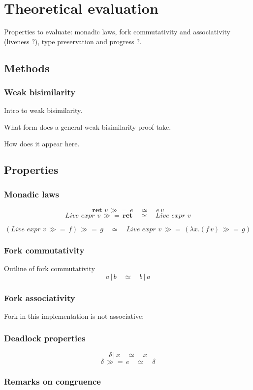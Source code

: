 \documentclass[12pt,twoside,notitlepage]{report}
\begin{document}
\section{Theoretical evaluation}
Properties to evaluate: monadic laws, fork commutativity and associativity (liveness ?), type preservation and progress ?.

\subsection{Methods}

\subsubsection{Weak bisimilarity}
Intro to weak bisimilarity.


What form does a general weak bisimilarity proof take.


How does it appear here.
\subsection{Properties}
\subsubsection{Monadic laws}

\[ \textbf{ret } v\,\gg=\, e\quad \simeq \quad e\,v \]
\[  \textit{Live expr }v\,\gg=\, \textbf{ret}\quad \simeq \quad \textit{Live expr }v \]

\[ (\textit{Live expr }v\, \gg=\, f) \, \gg=\, g \quad \simeq \quad \textit{Live expr }v\, \gg=\, (\lambda x. (f\, v) \, \gg=\, g ) \]

\subsubsection{Fork commutativity}
Outline of fork commutativity
\[ a\,|\,b\quad\simeq\quad b \, | \, a \]
\subsubsection{Fork associativity}
Fork in this implementation is not associative:
\subsubsection{Deadlock properties}
\[ \delta \, |\, x \quad \simeq \quad x \]
\[ \delta \, \gg=\, e\quad \simeq \quad \delta \]
\subsubsection{Remarks on congruence}
\end{document}
